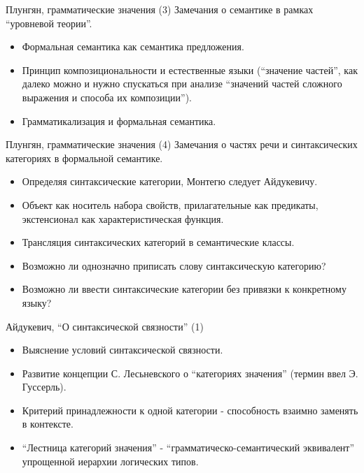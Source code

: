 \documentclass{beamer}
\begin{document}
\begin{frame}{Плунгян, грамматические значения (3)}
Замечания о семантике в рамках ``уровневой теории''.\\
\bigskip
\begin{itemize}
  \item Формальная семантика как семантика предложения.
  \item Принцип композициональности и естественные языки (``значение частей'', как далеко можно и нужно спускаться при анализе ``значений частей сложного выражения и способа их композиции'').
  \item Грамматикализация и формальная семантика.
\end{itemize}
\end{frame}

\begin{frame}{Плунгян, грамматические значения (4)}
Замечания о частях речи и синтаксических категориях в формальной семантике.\\
\bigskip
\begin{itemize}
  \item Определяя синтаксические категории, Монтегю следует Айдукевичу. 
  \item Объект как носитель набора свойств, прилагательные как предикаты, экстенсионал как характеристическая функция.
  \item Трансляция синтаксических категорий в семантические классы.
  \item Возможно ли однозначно приписать слову синтаксическую категорию?
  \item Возможно ли ввести синтаксические категории без привязки к конкретному языку?
\end{itemize}
\end{frame}


\begin{frame}{Айдукевич, ``О синтаксической связности'' (1)}
\begin{itemize}
  \item Выяснение условий синтаксической связности.
  \item Развитие концепции С. Лесьневского о ``категориях значения'' (термин ввел Э. Гуссерль).
  \item Критерий принадлежности к одной категории - способность взаимно заменять в контексте.
  \item ``Лестница категорий значения'' - ``грамматическо-семантический эквивалент'' упрощенной иерархии логических типов.
\end{itemize}
\end{frame}
\end{document}

